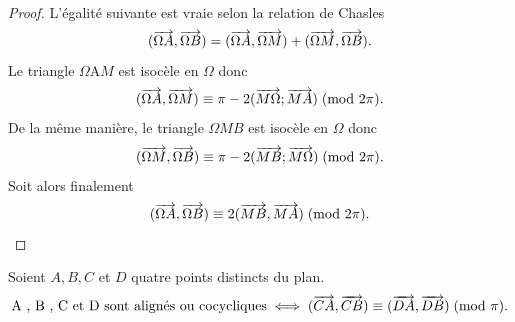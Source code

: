 \begin{proof}
    L'égalité suivante est vraie selon la relation de Chasles
    \begin{equation}
        (\overrightarrow{\Omega A},\overrightarrow{\Omega B}) = (\overrightarrow{\Omega A},\overrightarrow{\Omega M}) + 
        (\overrightarrow{\Omega M},\overrightarrow{\Omega B}).
    \end{equation}
    Le triangle \(\Omega \)A\( M\) est isocèle en \(\Omega\) donc
    \begin{equation}
        (\overrightarrow{\Omega A}, \overrightarrow{\Omega M}) \equiv \pi - 2 (\overrightarrow{M\Omega}; 
        \overrightarrow{MA})\!\pmod {2\pi}.
    \end{equation}
    De la même manière, le triangle \(\Omega M B\) est isocèle en \(\Omega\) 
    donc
    \begin{equation}
        (\overrightarrow{\Omega M}, \overrightarrow{\Omega B}) \equiv \pi - 2 (\overrightarrow{MB}; 
        \overrightarrow{M\Omega})\!\pmod {2\pi}.
    \end{equation}
    Soit alors finalement \begin{equation}
        (\overrightarrow{\Omega A}, \overrightarrow{\Omega B}) \equiv 2 (\overrightarrow{MB}, 
        \overrightarrow{MA})\!\pmod {2\pi}.
    \end{equation}
\end{proof}

\begin{theo}
    Soient \(A , B , C\) et \(D\) quatre points distincts du plan.
    \begin{equation}
        \text{A , B , C et D sont alignés ou cocycliques} \iff (\overrightarrow{CA}, 
        \overrightarrow{CB}) \equiv (\overrightarrow{DA}, \overrightarrow{DB})\!\pmod {\pi}.
    \end{equation}
\end{theo}

